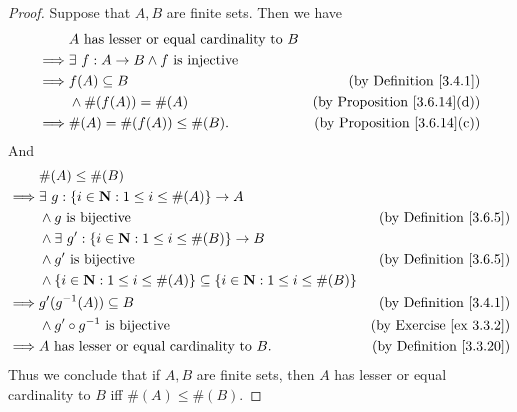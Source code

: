 \begin{proof}
    Suppose that \(A, B\) are finite sets.
    Then we have
    \begin{align*}
                 & A \text{ has lesser or equal cardinality to } B                                             \\
        \implies & \exists\ f : A \to B \land f \text{ is injective}                                           \\
        \implies & f(A) \subseteq B                                  & \text{(by Definition \ref{3.4.1})}      \\
                 & \land \#(f(A)) = \#(A)                            & \text{(by Proposition \ref{3.6.14}(d))} \\
        \implies & \#(A) = \#(f(A)) \leq \#(B).                      & \text{(by Proposition \ref{3.6.14}(c))}
    \end{align*}
    And
    \begin{align*}
                 & \#(A) \leq \#(B)                                                                                                                            \\
        \implies & \exists\ g : \{i \in \mathbf{N} : 1 \leq i \leq \#(A)\} \to A                                                                               \\
                 & \land g \text{ is bijective}                                                                          & \text{(by Definition \ref{3.6.5})}  \\
                 & \land \exists\ g' : \{i \in \mathbf{N} : 1 \leq i \leq \#(B)\} \to B                                                                        \\
                 & \land g' \text{ is bijective}                                                                         & \text{(by Definition \ref{3.6.5})}  \\
                 & \land \{i \in \mathbf{N} : 1 \leq i \leq \#(A)\} \subseteq \{i \in \mathbf{N} : 1 \leq i \leq \#(B)\}                                       \\
        \implies & g'(g^{-1}(A)) \subseteq B                                                                             & \text{(by Definition \ref{3.4.1})}  \\
                 & \land g' \circ g^{-1} \text{ is bijective}                                                            & \text{(by Exercise \ref{ex 3.3.2})} \\
        \implies & A \text{ has lesser or equal cardinality to } B.                                                      & \text{(by Definition \ref{3.3.20})}
    \end{align*}
    Thus we conclude that if \(A, B\) are finite sets, then \(A\) has lesser or equal cardinality to \(B\) iff \(\#(A) \leq \#(B)\).
\end{proof}

